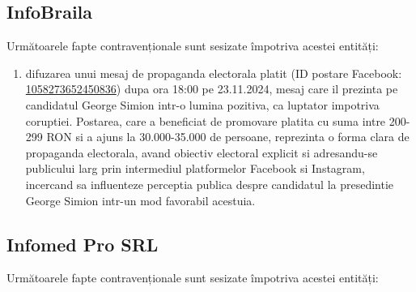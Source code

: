 \documentclass[a4paper,12pt]{article}
\begin{document}
\vspace{0.5cm}

\subsection{InfoBraila}
Următoarele fapte contravenționale sunt sesizate împotriva acestei entități:

\begin{enumerate}[leftmargin=*, label=\arabic*.)]
    \item difuzarea unui mesaj de propaganda electorala platit (ID postare Facebook: \href{https://www.facebook.com/ads/library/?id=1058273652450836}{1058273652450836}) dupa ora 18:00 pe 23.11.2024, mesaj care il prezinta pe candidatul George Simion intr-o lumina pozitiva, ca luptator impotriva coruptiei. Postarea, care a beneficiat de promovare platita cu suma intre 200-299 RON si a ajuns la 30.000-35.000 de persoane, reprezinta o forma clara de propaganda electorala, avand obiectiv electoral explicit si adresandu-se publicului larg prin intermediul platformelor Facebook si Instagram, incercand sa influenteze perceptia publica despre candidatul la presedintie George Simion intr-un mod favorabil acestuia.
\end{enumerate}

\vspace{0.5cm}

\subsection{Infomed Pro SRL}
Următoarele fapte contravenționale sunt sesizate împotriva acestei entități:
\end{document}
